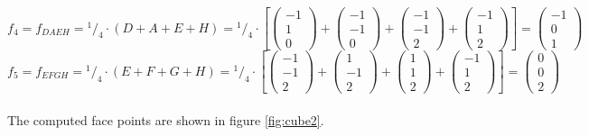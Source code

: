 \documentclass{article}
\newcommand*\rfrac[2]{{}^{#1}\!/_{#2}}%
\begin{document}
\[f_4=f_{DAEH}=\rfrac{1}{4}\cdot(D+A+E+H)=\rfrac{1}{4}\cdot\left[
\left({\begin{array}{c} -1 \\  1 \\ 0 \end{array}}\right)+
\left({\begin{array}{c} -1 \\ -1 \\ 0 \end{array}}\right)+
\left({\begin{array}{c} -1 \\  -1 \\ 2 \end{array}}\right)+
\left({\begin{array}{c} -1 \\  1 \\ 2 \end{array}}\right)\right]=
\left({\begin{array}{c} -1 \\ 0 \\ 1 \end{array}}\right)
\]
\[f_5=f_{EFGH}=\rfrac{1}{4}\cdot(E+F+G+H)=\rfrac{1}{4}\cdot\left[
\left({\begin{array}{c} -1 \\  -1 \\ 2 \end{array}}\right)+
\left({\begin{array}{c} 1 \\ -1 \\ 2 \end{array}}\right)+
\left({\begin{array}{c} 1 \\  1 \\ 2 \end{array}}\right)+
\left({\begin{array}{c} -1 \\  1 \\ 2 \end{array}}\right)\right]=
\left({\begin{array}{c} 0 \\ 0 \\ 2 \end{array}}\right)
\]
\\
The computed face points are shown in figure \ref{fig:cube2}.
\end{document}
